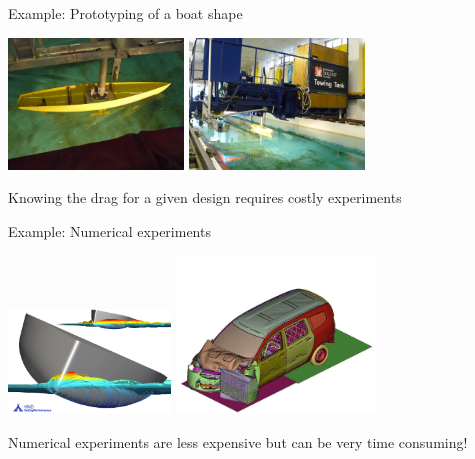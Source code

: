 \begin{frame}{}
\begin{exampleblock}{Example: Prototyping of a boat shape}
\begin{center}
\includegraphics[height=3.5cm]{1_stat_models/figures/carene} \qquad \includegraphics[height=3.5cm]{1_stat_models/figures/carene2}
\end{center}
Knowing the drag for a given design requires costly experiments
\end{exampleblock}
\end{frame}

\begin{frame}{}
\begin{exampleblock}{Example: Numerical experiments}
\begin{center}
\includegraphics[height=2.8cm]{1_stat_models/figures/waterflow} \qquad \includegraphics[height=4.2cm]{1_stat_models/figures/crash/image15}
\end{center}
Numerical experiments are less expensive but can be very time consuming!
\end{exampleblock}
\end{frame}


